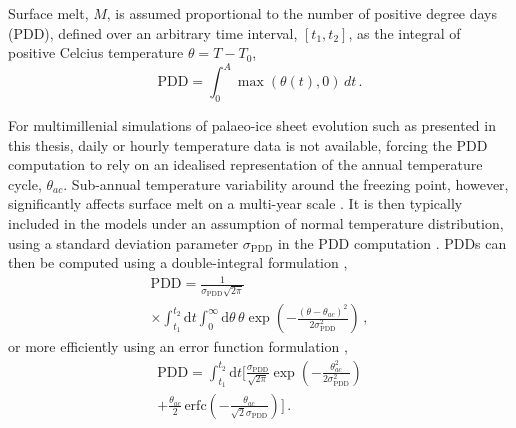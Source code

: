\documentclass[a4paper]{kappa}
\newcommand{\PDD}[0]{\mathrm{PDD}}
\newcommand{\sPDD}[0]{\sigma_{\mathrm{PDD}}}
\begin{document}
Surface melt, $M$, is assumed proportional to the number of positive degree
days (PDD), defined over an arbitrary time interval, $[t_1, t_2]$, as the
integral of positive Celcius temperature $\theta = T-T_0$,
\begin{equation}
    \mathrm{PDD} = \int_{0}^{A}\max(\theta(t),0)\,dt \,.
\end{equation}

For multimillenial simulations of palaeo-ice sheet evolution such as
presented in this thesis, daily or hourly temperature data is not available,
forcing the PDD computation to rely on an idealised representation of the
annual temperature cycle, $\theta_{ac}$. Sub-annual temperature variability around
the freezing point, however, significantly affects surface melt on a multi-year
scale \citep{Arnold.Mackay.1964}. It is then typically included in the models
under an assumption of normal temperature distribution, using a standard
deviation parameter $\sPDD$ in the PDD computation \citep{Braithwaite.1984}.
PDDs can then be computed using a double-integral formulation
\citep{Reeh.1991},
\begin{multline}
    \PDD = \frac{1}{\sPDD\sqrt{2\pi}} \\
        \times
        \int_{t_1}^{t_2} \mathrm{d}t
        \int_{0}^{\infty} \mathrm{d}\theta \,
        \theta \exp\left({-\frac{(\theta-\theta_{ac})^2}{2\sPDD^2}}\right) \,,
\end{multline}
or more efficiently using an error function formulation
\citep{Calov.Greve.2005},
\begin{multline}
    \label{eqn:calovgreve}
    \PDD = \int_{t_1}^{t_2} \mathrm{d}t
        \bigg[\frac{\sPDD}{\sqrt{2\pi}}
                \exp\left({-\frac{\theta_{ac}^2}{2\sPDD^2}}\right) \\
              + \frac{\theta_{ac}}{2} \, \mathrm{erfc}
                \left(-\frac{\theta_{ac}}{\sqrt{2}\sPDD}\right)\bigg] \,.
\end{multline}
\end{document}
